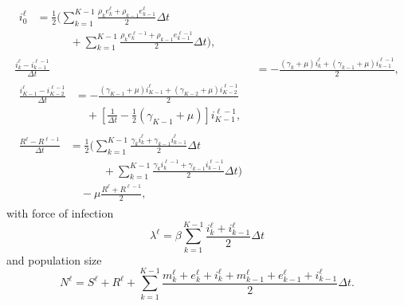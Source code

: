\documentclass{jpmarticle}
\let\subequationsorig\subequations%
\let\endsubequationsorig\endsubequations%
\renewenvironment{subequations}{
  \subequationsorig
  \renewcommand{\theequation}{\theparentequation.\arabic{equation}}
}{
  \endsubequationsorig
}
\begin{document}
\begin{subequations}
\begin{align}
    \\
    \begin{split}
      i_0^{\ell} &=
      \frac{1}{2} \Bigg(
      \sum_{k = 1}^{K - 1}
      \frac{\rho_k e_k^{\ell} + \rho_{k - 1} e_{k - 1}^{\ell}}{2}
      \Delta t
      \\ & \quad\quad\quad {}
      + \sum_{k = 1}^{K - 1}
      \frac{\rho_k e_k^{\ell - 1} + \rho_{k - 1} e_{k - 1}^{\ell - 1}}{2}
      \Delta t
      \Bigg),
    \end{split}
    \\
    \frac{i_k^{\ell} - i_{k - 1}^{\ell - 1}}{\Delta t} &=
    - \frac{(\gamma_k + \mu) i_k^{\ell}
      + (\gamma_{k - 1} + \mu) i_{k - 1}^{\ell - 1}}{2},
    \\
    \begin{split}
      \frac{i_{K - 1}^{\ell} - i_{K - 2}^{\ell - 1}}{\Delta t} &=
      - \frac{(\gamma_{K - 1} + \mu) i_{K - 1}^{\ell}
        + (\gamma_{K - 2} + \mu) i_{K - 2}^{\ell - 1}}{2}
      \\ & \quad {}
      + \left[\frac{1}{\Delta t}
        - \frac{1}{2} (\gamma_{K - 1} + \mu)\right]
      i_{K - 1}^{\ell - 1},
    \end{split}
    \\
    \begin{split}
      \frac{R^{\ell} - R^{\ell - 1}}{\Delta t} &=
      \frac{1}{2} \Bigg(
      \sum_{k = 1}^{K - 1}
      \frac{\gamma_k i_k^{\ell} + \gamma_{k - 1} i_{k - 1}^{\ell}}{2}
      \Delta t
      \\ & \quad\quad\quad {}
      + \sum_{k = 1}^{K - 1}
      \frac{\gamma_k i_k^{\ell - 1} + \gamma_{k - 1} i_{k - 1}^{\ell - 1}}{2}
      \Delta t
      \Bigg)
      \\ & \quad {}
      - \mu \frac{R^{\ell} + R^{\ell - 1}}{2},
    \end{split}
  \end{align}
  with force of infection
  \begin{equation}
    \lambda^{\ell} =
    \beta \sum_{k = 1}^{K - 1}
    \frac{i_k^{\ell} + i_{k - 1}^{\ell}}{2}
    \Delta t
  \end{equation}
  and population size
  \begin{equation}
    N^{\ell} =
    S^{\ell} + R^{\ell}
    + \sum_{k = 1}^{K - 1}
    \frac{m_k^{\ell} + e_k^{\ell} + i_k^{\ell} + m_{k - 1}^{\ell}
      + e_{k - 1}^{\ell} + i_{k - 1}^{\ell}}
    {2}
    \Delta t.
  \end{equation}
\end{subequations}
\end{document}
